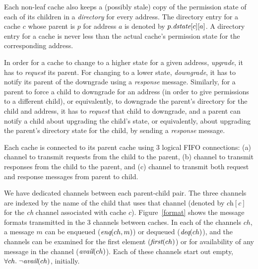 
Each non-leaf cache also keeps a (possibly stale) copy of the permission state of
each of its children in a \emph{directory} for every address. The directory
entry for a cache $c$ whose parent is $p$ for address $a$ is denoted by
$p.\textit{dstate}[c][a]$. A directory entry for a cache is never
less than the actual cache's permission state for the corresponding address.

In order for a cache to change to a higher state for a given address, \ie{}
\emph{upgrade}, it has to \emph{request} its parent.  For changing to a lower
state, \ie{} \emph{downgrade}, it has to notify its parent of the downgrade
using a \emph{response} message.  Similarly, for a parent to force a child to
downgrade for an address (in order to give permissions to a different child),
or equivalently, to downgrade the parent's directory for the child and address,
it has to \emph{request} that child to downgrade, and a parent can notify a
child about upgrading the child's state, or equivalently, about upgrading the
parent's directory state for the child, by sending a \emph{response} message.

Each cache is connected to its parent cache using 3 logical FIFO connections:
(a) \cpReq{} channel to transmit requests from the child to the parent, (b)
\cpResp{} channel to transmit responses from the child to the parent, and (c)
\pc{} channel to transmit both request and response messages from parent to
child. 

We have dedicated channels between each parent-child pair. The three channels
are indexed by the name of the child that uses that channel (denoted by
$\textit{ch}[c]$ for the \textit{ch} channel associated
with cache $c$).  Figure~\ref{format} shows the message formats
transmitted in the 3
channels between caches. In each of the channels $ch$, a message $m$
can be enqueued ($\textit{enq}(ch, m)$) or dequeued ($\textit{deq}(ch)$), and the
channels can be examined for the first element ($\textit{first}(ch)$) or for
availability of any message in the channel
($\textit{avail}(ch)$). Each of these channels start out empty, \ie{} $\forall ch. \;
\neg \textit{avail}(ch)$, initially.

